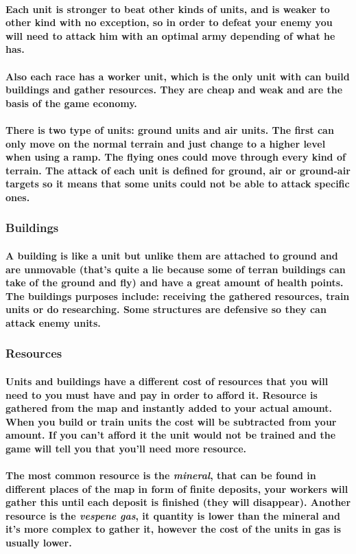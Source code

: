 \documentclass[a4paper,10pt]{article}
\newcommand{\p}[1]{\paragraph{\indent\textnormal{#1}}}
\begin{document}
      \p{Each unit is stronger to beat other kinds of units, and is weaker to other kind with no exception, so in order to defeat your enemy you will need to attack him with an optimal army depending of what he has.}

      \p{Also each race has a worker unit, which is the only unit with can build buildings and gather resources. They are cheap and weak and are the basis of the game economy.}

      \p{There is two type of units: ground units and air units. The first can only move on the normal terrain and just change to a higher level when using a ramp. The flying ones could move through every kind of terrain. The attack of each unit is defined for ground, air or ground-air targets so it means that some units could not be able to attack specific ones.}


    \subsubsection{Buildings}

      \p{A building is like a unit but unlike them are attached to ground and are unmovable (that's quite a lie because some of terran buildings can take of the ground and fly) and have a great amount of health points. The buildings purposes include: receiving the gathered resources, train units or do researching. Some structures are defensive so they can attack enemy units.}


    \subsubsection{Resources}

     \p{Units and buildings have a different cost of resources that you will need to you must have and pay in order to afford it. Resource is gathered from the map and instantly added to your actual amount. When you build or train units the cost will be subtracted from your amount. If you can't afford it the unit would not be trained and the game will tell you that you'll need more resource.}

     \p{The most common resource is the \textit{mineral}, that can be found in different places of the map in form of finite deposits, your workers will gather this until each deposit is finished (they will disappear). Another resource is the \textit{vespene gas}, it quantity is lower than the mineral and it's more complex to gather it, however the cost of the units in gas is usually lower.}
\end{document}
